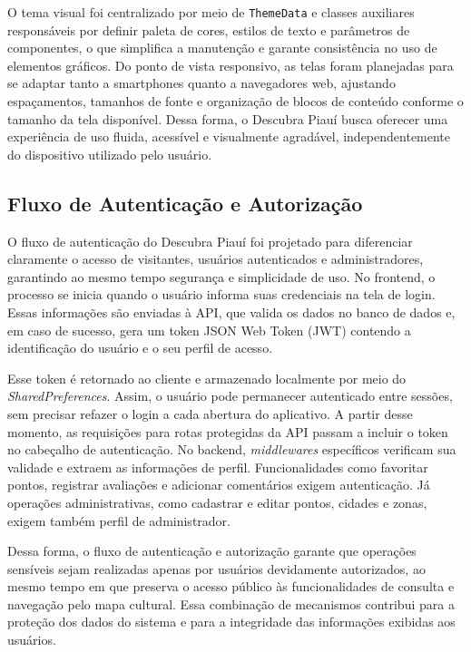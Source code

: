O tema visual foi centralizado por meio de \texttt{ThemeData} e classes auxiliares responsáveis por definir paleta de cores, estilos de texto e parâmetros de componentes, o que simplifica a manutenção e garante consistência no uso de elementos gráficos. Do ponto de vista responsivo, as telas foram planejadas para se adaptar tanto a smartphones quanto a navegadores web, ajustando espaçamentos, tamanhos de fonte e organização de blocos de conteúdo conforme o tamanho da tela disponível. Dessa forma, o Descubra Piauí busca oferecer uma experiência de uso fluida, acessível e visualmente agradável, independentemente do dispositivo utilizado pelo usuário.

\subsection{Fluxo de Autenticação e Autorização}

O fluxo de autenticação do Descubra Piauí foi projetado para diferenciar claramente o acesso de visitantes, usuários autenticados e administradores, garantindo ao mesmo tempo segurança e simplicidade de uso. No frontend, o processo se inicia quando o usuário informa suas credenciais na tela de login. Essas informações são enviadas à API, que valida os dados no banco de dados e, em caso de sucesso, gera um token JSON Web Token (JWT) contendo a identificação do usuário e o seu perfil de acesso.

Esse token é retornado ao cliente e armazenado localmente por meio do
\textit{SharedPreferences}. Assim, o usuário pode permanecer autenticado entre
sessões, sem precisar refazer o login a cada abertura do aplicativo. A partir
desse momento, as requisições para rotas protegidas da API passam a incluir o
token no cabeçalho de autenticação. No backend, \textit{middlewares}
específicos verificam sua validade e extraem as informações de perfil.
Funcionalidades como favoritar pontos, registrar avaliações e adicionar
comentários exigem autenticação. Já operações administrativas, como cadastrar e
editar pontos, cidades e zonas, exigem também perfil de administrador.

Dessa forma, o fluxo de autenticação e autorização garante que operações sensíveis sejam realizadas apenas por usuários devidamente autorizados, ao mesmo tempo em que preserva o acesso público às funcionalidades de consulta e navegação pelo mapa cultural. Essa combinação de mecanismos contribui para a proteção dos dados do sistema e para a integridade das informações exibidas aos usuários.


